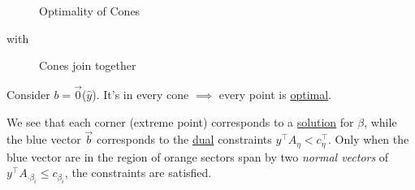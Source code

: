 \begin{figure}[H]
	\centering
	\caption[Caption for LOF]{Optimality of Cones\protect\footnotemark}
	\label{fig:opt-cones}
\end{figure}
with
\begin{figure}[H]
	\centering
	\caption{Cones join together}
	\label{fig:cones-join}
\end{figure}

\begin{note}
	Consider \(b = \vec{0}\)(\(\hat{y}\)). It's in every cone \(\implies\) every point is \hyperref[def:optimal-solution]{optimal}.
\end{note}

\begin{remark}
	We see that each corner (extreme point) corresponds to a \hyperref[def:solution]{solution} for \(\beta\),
	while the blue vector \(\vec{b}\) corresponds to the \hyperref[def:dual]{dual} constraints \(y^{\top} A_{\eta}<c_{\eta}^{\top}\).
	Only when the blue vector are in the region of orange sectors span by two \emph{normal vectors} of \(y^{\top}A_{\cdot \beta_i}\leq c_{\beta_i}\),
	the constraints are satisfied.
\end{remark}

